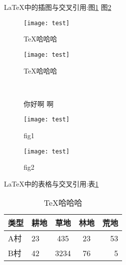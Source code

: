 \documentclass[12pt]{article} %
\begin{document}
	
	\LaTeX 中的插图与交叉引用:图\ref{fig-image} 图\ref{fig-image2}
	\begin{figure}[htbp]
		\centering %
		\texttt{[image: test]}
		\caption{\TeX 哈哈哈} \label{fig-image}
	\end{figure}

	\begin{figure}[htbp]
	\centering %
	\texttt{[image: test]}
	\caption{\TeX 哈哈哈} \label{fig-image2}
	\end{figure}
	
	
	\begin{figure}[h]
		\centering 
		\label{fig:capstd} 
		\caption{你好啊 啊}
	\end{figure}
	
	\begin{figure}
		\begin{minipage}[t]{0.5\linewidth}
			\centering
			\texttt{[image: test]}
			\caption{fig1}
			\label{fig:side:a}
		\end{minipage}%
		\begin{minipage}[t]{0.5\linewidth}
			\centering
			\texttt{[image: test]}
			\caption{fig2}
			\label{fig:side:b}
		\end{minipage}
	\end{figure}



	\LaTeX 中的表格与交叉引用:表\ref{fig-tab}
	\begin{table}
		\centering %
		\begin{tabular}{|l||p{1.5cm}|c|c r|} %
			\hline	%
			类型 & 耕地 & 草地 & 林地 & 荒地 \\
			\hline \hline %
			A村 & 23 & 435 & 23 & 53 \\
			\hline
			B村 & 42 & 3234 & 76 & 5 \\
			\hline
		\end{tabular}
		\caption{\TeX 哈哈哈} \label{fig-tab}
	\end{table}
	
\end{document}
